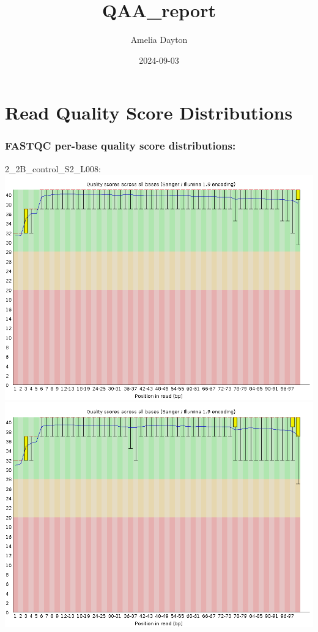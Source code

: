 \documentclass[
]{article}
\title{QAA\_report}
\author{Amelia Dayton}
\date{2024-09-03}
\begin{document}
\maketitle

\section{Read Quality Score
Distributions}\label{read-quality-score-distributions}

\subsubsection{FASTQC per-base quality score
distributions:}\label{fastqc-per-base-quality-score-distributions}

2\_2B\_control\_S2\_L008:
\includegraphics{fastqc_plots/2_2B_control_S2_L008_R1_001_perbasequality.png}
\includegraphics{fastqc_plots/2_2B_control_S2_L008_R2_001_perbasequality.png}
\end{document}

